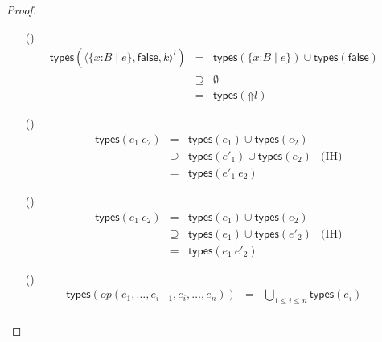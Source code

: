 \documentclass[9pt]{extarticle}
\newcommand{\ottnt}[1]{\mathit{#1}}
\newcommand{\ottmv}[1]{\mathit{#1}}
\newcommand{\ottsym}[1]{#1}
\begin{document}
\begin{lemma}
\begin{proof}
{\begin{itemize}
\[\begin{array}{rclr}
        &=&  \mathsf{types} ( \ottnt{k} ) 
      \end{array} \]
    \item[(\E{CheckFail})]  \[ \begin{array}{rclr}
         \mathsf{types} (  \langle   \{ \mathit{x} \mathord{:} \ottnt{B} \mathrel{\mid} \ottnt{e} \}  ,   \mathsf{false}  ,  \ottnt{k}  \rangle^{ \ottnt{l} }  )  &=&   \mathsf{types} (  \{ \mathit{x} \mathord{:} \ottnt{B} \mathrel{\mid} \ottnt{e} \}  )   \cup   \mathsf{types} (  \mathsf{false}  )   & \\
        &\supseteq&  \emptyset  & \\
        &=&  \mathsf{types} (  \mathord{\Uparrow}  \ottnt{l}  ) 
      \end{array} \]
    \item[(\E{AppL})]  \[ \begin{array}{rclr}
         \mathsf{types} (  \ottnt{e_{{\mathrm{1}}}} ~ \ottnt{e_{{\mathrm{2}}}}  )  &=&   \mathsf{types} ( \ottnt{e_{{\mathrm{1}}}} )   \cup   \mathsf{types} ( \ottnt{e_{{\mathrm{2}}}} )   & \\
        &\supseteq&   \mathsf{types} ( \ottnt{e'_{{\mathrm{1}}}} )   \cup   \mathsf{types} ( \ottnt{e_{{\mathrm{2}}}} )   & \text{(IH)} \\
        &=&  \mathsf{types} (  \ottnt{e'_{{\mathrm{1}}}} ~ \ottnt{e_{{\mathrm{2}}}}  ) 
      \end{array} \]
    \item[(\E{AppR})]  \[ \begin{array}{rclr}
         \mathsf{types} (  \ottnt{e_{{\mathrm{1}}}} ~ \ottnt{e_{{\mathrm{2}}}}  )  &=&   \mathsf{types} ( \ottnt{e_{{\mathrm{1}}}} )   \cup   \mathsf{types} ( \ottnt{e_{{\mathrm{2}}}} )   & \\
        &\supseteq&   \mathsf{types} ( \ottnt{e_{{\mathrm{1}}}} )   \cup   \mathsf{types} ( \ottnt{e'_{{\mathrm{2}}}} )   & \text{(IH)} \\
        &=&  \mathsf{types} (  \ottnt{e_{{\mathrm{1}}}} ~ \ottnt{e'_{{\mathrm{2}}}}  ) 
      \end{array} \]
    \item[(\E{OpInner})]  \[ \begin{array}{rclr}
         \mathsf{types} ( \ottnt{op}  \ottsym{(}  \ottnt{e_{{\mathrm{1}}}}  \ottsym{,}  \dots  \ottsym{,}  \ottnt{e_{{\ottmv{i}-1}}}  \ottsym{,}  \ottnt{e_{\ottmv{i}}}  \ottsym{,}  \dots  \ottsym{,}  \ottnt{e_{\ottmv{n}}}  \ottsym{)} )  &=& \bigcup_{1 \le i \le n}  \mathsf{types} ( \ottnt{e_{\ottmv{i}}} )  & \\

\end{array}\]
\end{itemize}}
\end{proof}
\end{lemma}
\end{document}

